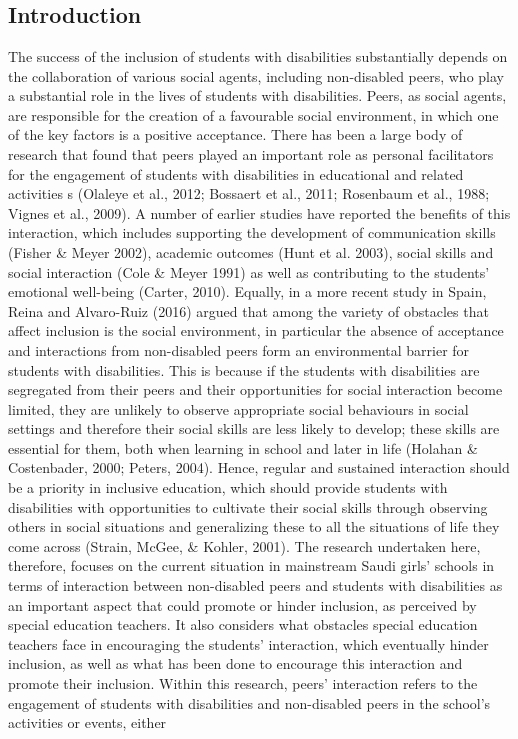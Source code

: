 \documentclass[11.5pt]{sig-alternate}
\begin{document}
\vspace{5mm}
\section*{\vspace{140mm}}
\begin{large}
\section*{Introduction}
The success of the inclusion of students with disabilities substantially depends on the collaboration of various social agents, including non-disabled peers, who play a substantial role in the lives of students with disabilities. Peers, as social agents, are responsible for the creation of a favourable social environment, in which one of the key factors is a positive acceptance. There has been a large body of research that found that peers played an important role as personal facilitators for the engagement of students with disabilities in educational and related activities s (Olaleye et al., 2012; Bossaert et al., 2011; Rosenbaum et al., 1988; Vignes et al., 2009). A number of earlier studies have reported the benefits of this interaction, which includes supporting the development of communication skills (Fisher \& Meyer 2002), academic outcomes (Hunt et al. 2003), social skills and social interaction (Cole \& Meyer 1991) as well as contributing to the students’ emotional well-being (Carter, 2010). Equally, in a more recent study in Spain, Reina and Alvaro-Ruiz (2016) argued that among the variety of obstacles that affect inclusion is the social environment, in particular the absence of acceptance and interactions from non-disabled peers form an environmental barrier for students with disabilities. This is because if the students with disabilities are segregated from their peers and their opportunities for social interaction become limited, they are unlikely to observe appropriate social behaviours in social settings and therefore their social skills are less likely to develop; these skills are essential for them, both when learning in school and later in life (Holahan \& Costenbader, 2000; Peters, 2004). Hence, regular and sustained interaction should be a priority in inclusive education, which should provide students with disabilities with opportunities to cultivate their social skills through observing others in social situations and generalizing these to all the situations of life they come across (Strain, McGee, \& Kohler, 2001). The research undertaken here, therefore, focuses on the current situation in mainstream Saudi girls’ schools in terms of interaction between non-disabled peers and students with disabilities as an important aspect that could promote or hinder inclusion, as perceived by special education teachers. It also considers what obstacles special education teachers face in encouraging the students’ interaction, which eventually hinder inclusion, as well as what has been done to encourage this interaction and promote their inclusion. Within this research, peers’ interaction refers to the engagement of students with disabilities and non-disabled peers in the school’s activities or events, either 
\end{large}
\end{document}
